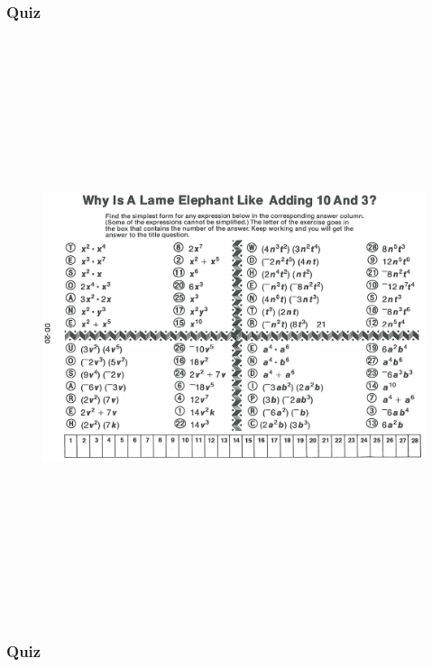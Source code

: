 \documentclass[a4paper,12pt]{article}
\newcommand\quiz{
\subsubsection{Quiz}\vspace{-0.5cm}
}
\begin{document}
\newpage
\quiz
\begin{figure}[!h]
	\centering
	\includegraphics[height=17cm, angle=90, origin=c]{pizzazz/pizzazz_set1_7.pdf}
\end{figure}
\newpage
\quiz
\end{document}
